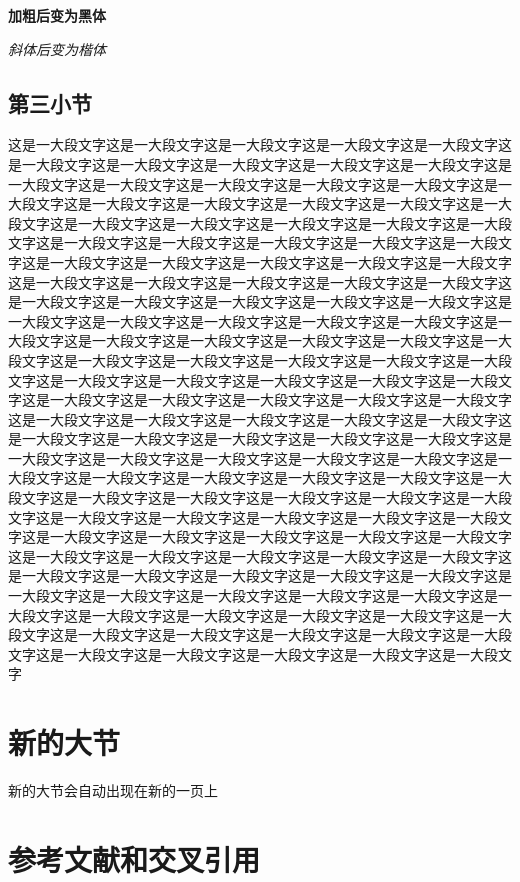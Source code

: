 \documentclass[supercite]{HustGraduPaper}
\begin{document}
	{\bfseries 加粗后变为黑体}
	
	{\itshape 斜体后变为楷体}
	
	\subsection{第三小节}
	这是一大段文字这是一大段文字这是一大段文字这是一大段文字这是一大段文字这是一大段文字这是一大段文字这是一大段文字这是一大段文字这是一大段文字这是一大段文字这是一大段文字这是一大段文字这是一大段文字这是一大段文字这是一大段文字这是一大段文字这是一大段文字这是一大段文字这是一大段文字这是一大段文字这是一大段文字这是一大段文字这是一大段文字这是一大段文字这是一大段文字这是一大段文字这是一大段文字这是一大段文字这是一大段文字这是一大段文字这是一大段文字这是一大段文字这是一大段文字这是一大段文字这是一大段文字这是一大段文字这是一大段文字这是一大段文字这是一大段文字这是一大段文字这是一大段文字这是一大段文字这是一大段文字这是一大段文字这是一大段文字这是一大段文字这是一大段文字这是一大段文字这是一大段文字这是一大段文字这是一大段文字这是一大段文字这是一大段文字这是一大段文字这是一大段文字这是一大段文字这是一大段文字这是一大段文字这是一大段文字这是一大段文字这是一大段文字这是一大段文字这是一大段文字这是一大段文字这是一大段文字这是一大段文字这是一大段文字这是一大段文字这是一大段文字这是一大段文字这是一大段文字这是一大段文字这是一大段文字这是一大段文字这是一大段文字这是一大段文字这是一大段文字这是一大段文字这是一大段文字这是一大段文字这是一大段文字这是一大段文字这是一大段文字这是一大段文字这是一大段文字这是一大段文字这是一大段文字这是一大段文字这是一大段文字这是一大段文字这是一大段文字这是一大段文字这是一大段文字这是一大段文字这是一大段文字这是一大段文字这是一大段文字这是一大段文字这是一大段文字这是一大段文字这是一大段文字这是一大段文字这是一大段文字这是一大段文字这是一大段文字这是一大段文字这是一大段文字这是一大段文字这是一大段文字这是一大段文字这是一大段文字这是一大段文字这是一大段文字这是一大段文字这是一大段文字这是一大段文字这是一大段文字这是一大段文字这是一大段文字这是一大段文字这是一大段文字这是一大段文字这是一大段文字这是一大段文字这是一大段文字这是一大段文字这是一大段文字这是一大段文字这是一大段文字这是一大段文字这是一大段文字这是一大段文字这是一大段文字这是一大段文字这是一大段文字这是一大段文字这是一大段文字这是一大段文字
	\section{新的大节}
	新的大节会自动出现在新的一页上
	\section{参考文献和交叉引用}\label{sec:ref}
\end{document}
